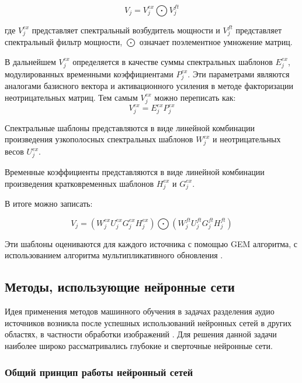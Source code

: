 \begin{equation}
V_j = V_j^{ex} \bigodot V_j^{ft}
\end{equation}

где $V_j^{ex}$ представляет спектральный возбудитель мощности и $V_j^{ft}$ представляет спектральный фильтр мощности, $\bigodot$ означает поэлементное умножение матриц.

В дальнейшем $V_j^{ex}$ определяется в качестве суммы спектральных шаблонов $E_j^{ex}$, модулированных 	временными коэффициентами $P_j^{ex}$. Эти параметрами являются аналогами базисного вектора и активационного усиления в методе факторизации неотрицательных матриц. Тем самым $V_j^{ex}$ можно переписать как:
\begin{equation}
V_j^{ex} = E_j^{ex}P_j^{ex}
\end{equation}

Спектральные шаблоны представляются в виде линейной комбинации произведения узкополосных спектральных шаблонов $W_j^{ex}$ и неотрицательных весов $U_j^{ex}$.

Временные коэффициенты представляются в виде линейной комбинации произведения кратковременных шаблонов $H_j^{ex}$ и $G_j^{ex}$.

В итоге можно записать:

\begin{equation}
V_j = (W_j^{ex}U_j^{ex}G_j^{ex}H_j^{ex}) \bigodot (W_j^{ft}U_j^{ft}G_j^{ft}H_j^{ft})
\end{equation}

Эти шаблоны оцениваются для каждого источника с помощью GEM алгоритма, с использованием алгоритма мультипликативного обновления \cite{DLee}.

\subsection{Методы, использующие нейронные сети}

Идея применения методов машинного обучения в задачах разделения аудио источников возникла после успешных использований нейронных сетей в других областях, в частности обработки изображений \cite{[Krizhevsky}. Для решения данной задачи наиболее широко рассматривались глубокие\cite{[Grais} и сверточные\cite{[Chandna} нейронные сети.

\subsubsection{Общий принцип работы нейронный сетей}

